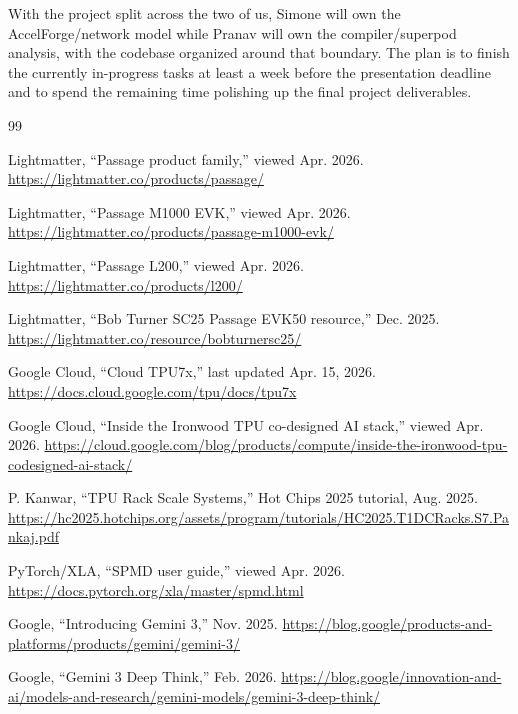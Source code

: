 \documentclass[conference,onecolumn]{IEEEtran}
\begin{document}
With the project split across the two of us, Simone will own the AccelForge/network
model while Pranav will own the compiler/superpod analysis, with the codebase organized around that boundary. The plan is to finish the currently in-progress tasks at least a week before the presentation deadline and to spend the remaining time polishing up the final project deliverables.

\begin{thebibliography}{99}

Lightmatter, ``Passage product family,'' viewed Apr. 2026.
\url{https://lightmatter.co/products/passage/}

Lightmatter, ``Passage M1000 EVK,'' viewed Apr. 2026.
\url{https://lightmatter.co/products/passage-m1000-evk/}

Lightmatter, ``Passage L200,'' viewed Apr. 2026.
\url{https://lightmatter.co/products/l200/}

Lightmatter, ``Bob Turner SC25 Passage EVK50 resource,'' Dec. 2025.
\url{https://lightmatter.co/resource/bobturnersc25/}

Google Cloud, ``Cloud TPU7x,'' last updated Apr. 15, 2026.
\url{https://docs.cloud.google.com/tpu/docs/tpu7x}

Google Cloud, ``Inside the Ironwood TPU co-designed AI stack,'' viewed Apr. 2026.
\url{https://cloud.google.com/blog/products/compute/inside-the-ironwood-tpu-codesigned-ai-stack/}

P. Kanwar, ``TPU Rack Scale Systems,'' Hot Chips 2025 tutorial, Aug. 2025.
\url{https://hc2025.hotchips.org/assets/program/tutorials/HC2025.T1DCRacks.S7.Pankaj.pdf}

PyTorch/XLA, ``SPMD user guide,'' viewed Apr. 2026.
\url{https://docs.pytorch.org/xla/master/spmd.html}

Google, ``Introducing Gemini 3,'' Nov. 2025.
\url{https://blog.google/products-and-platforms/products/gemini/gemini-3/}

Google, ``Gemini 3 Deep Think,'' Feb. 2026.
\url{https://blog.google/innovation-and-ai/models-and-research/gemini-models/gemini-3-deep-think/}

\end{thebibliography}
\end{document}
